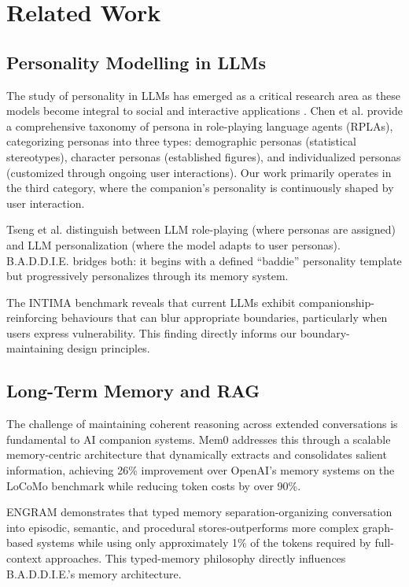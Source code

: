 \documentclass[sigconf]{acmart}
\begin{document}
\section{Related Work}

\subsection{Personality Modelling in LLMs}

The study of personality in LLMs has emerged as a critical research area as these models become integral to social and interactive applications \cite{findings2025personality}. Chen et al. \cite{chen2024tmlr-persona} provide a comprehensive taxonomy of persona in role-playing language agents (RPLAs), categorizing personas into three types: demographic personas (statistical stereotypes), character personas (established figures), and individualized personas (customized through ongoing user interactions). Our work primarily operates in the third category, where the companion's personality is continuously shaped by user interaction.

Tseng et al. \cite{tseng2024two} distinguish between LLM role-playing (where personas are assigned) and LLM personalization (where the model adapts to user personas). B.A.D.D.I.E. bridges both: it begins with a defined ``baddie'' personality template but progressively personalizes through its memory system.

The INTIMA benchmark \cite{arxiv2508.09998} reveals that current LLMs exhibit companionship-reinforcing behaviours that can blur appropriate boundaries, particularly when users express vulnerability. This finding directly informs our boundary-maintaining design principles.

\subsection{Long-Term Memory and RAG}

The challenge of maintaining coherent reasoning across extended conversations is fundamental to AI companion systems. Mem0 \cite{arxiv2504.19413} addresses this through a scalable memory-centric architecture that dynamically extracts and consolidates salient information, achieving 26\% improvement over OpenAI's memory systems on the LoCoMo benchmark while reducing token costs by over 90\%.

ENGRAM \cite{arxiv2511.12960} demonstrates that typed memory separation-organizing conversation into episodic, semantic, and procedural stores-outperforms more complex graph-based systems while using only approximately 1\% of the tokens required by full-context approaches. This typed-memory philosophy directly influences B.A.D.D.I.E.'s memory architecture.
\end{document}
